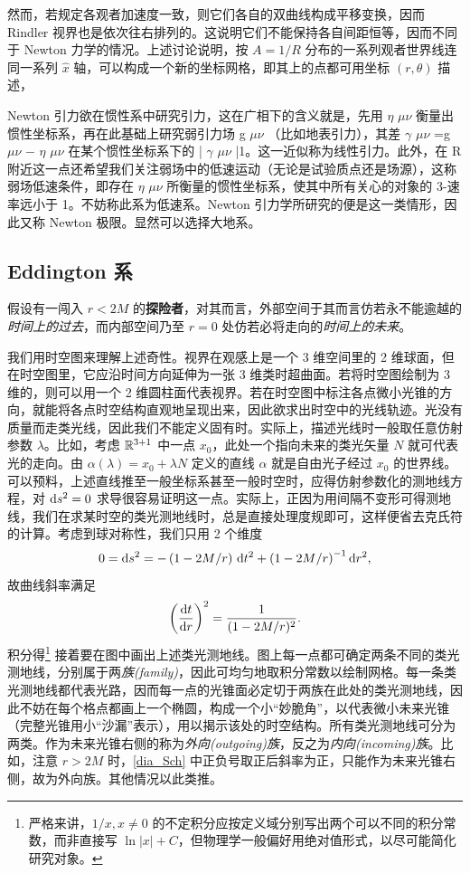然而，若规定各观者加速度一致，则它们各自的双曲线构成平移变换，因而 Rindler 视界也是依次往右排列的。这说明它们不能保持各自间距恒等，因而不同于 Newton 力学的情况。上述讨论说明，按 $A=1/R$ 分布的一系列观者世界线连同一系列 $\hat x$ 轴，可以构成一个新的坐标网格，即其上的点都可用坐标 $(r,\theta)$ 描述，


Newton 引力欲在惯性系中研究引力，这在广相下的含义就是，先用 
 $\eta$  $\mu\nu$ 
 衡量出惯性坐标系，再在此基础上研究弱引力场 
g $\mu\nu$ 
（比如地表引力），其差 
 $\gamma$  $\mu\nu$ =g $\mu\nu$ − $\eta$  $\mu\nu$ 
 在某个惯性坐标系下的 
| $\gamma$  $\mu\nu$ |1。这一近似称为线性引力。此外，在 R
 附近这一点还希望我们关注弱场中的低速运动（无论是试验质点还是场源），这称弱场低速条件，即存在  $\eta$  $\mu\nu$ 
 所衡量的惯性坐标系，使其中所有关心的对象的 3-速率远小于 1。不妨称此系为低速系。Newton 引力学所研究的便是这一类情形，因此又称 Newton 极限。显然可以选择大地系。

\subsection{Eddington 系}
假设有一闯入 $r<2M$ 的\textbf{探险者}，对其而言，外部空间于其而言仿若永不能逾越的\textit{时间上的过去}，而内部空间乃至 $r=0$ 处仿若必将走向的\textit{时间上的未来}。



我们用时空图来理解上述奇性。视界在观感上是一个 3 维空间里的 2 维球面，但在时空图里，它应沿时间方向延伸为一张 3 维类时超曲面。若将时空图绘制为 3 维的，则可以用一个 2 维圆柱面代表视界。若在时空图中标注各点微小光锥的方向，就能将各点时空结构直观地呈现出来，因此欲求出时空中的光线轨迹。光没有质量而走类光线，因此我们不能定义固有时。实际上，描述光线时一般取任意仿射参数 $\lambda$。比如，考虑 $\mathbb{R}^{3+1}$ 中一点 $x_{0}$，此处一个指向未来的类光矢量 $N$ 就可代表光的走向。由 $\alpha(\lambda)=x_{0}+\lambda N$ 定义的直线 $\alpha$ 就是自由光子经过 $x_{0}$ 的世界线。可以预料，上述直线推至一般坐标系甚至一般时空时，应得仿射参数化的测地线方程，对 $\dd s^2=0$ 求导很容易证明这一点。实际上，正因为用间隔不变形可得测地线，我们在求某时空的类光测地线时，总是直接处理度规即可，这样便省去克氏符的计算。考虑到球对称性，我们只用 2 个维度
\[
0=\dd s^2=-\left(1-{2M}/{r}\right)\,\text d t^2+\left(1-{2M}/{r}\right)^{-1}\text d r^2,
\]
故曲线斜率满足
\[
\left(\dv{t}{r}\right)^2=\frac{1}{(1-2M/r)^2}.
\]
积分得\footnote{严格来讲，$1/x,x\ne 0$ 的不定积分应按定义域分别写出两个可以不同的积分常数，而非直接写 $\ln |x|+C$，但物理学一般偏好用绝对值形式，以尽可能简化研究对象。}
接着要在图中画出上述类光测地线。图上每一点都可确定两条不同的类光测地线，分别属于两\textit{族(family)}，因此可均匀地取积分常数以绘制网格。每一条类光测地线都代表光路，因而每一点的光锥面必定切于两族在此处的类光测地线，因此不妨在每个格点都画上一个椭圆，构成一个小“妙脆角”，以代表微小未来光锥（完整光锥用小“沙漏”表示），用以揭示该处的时空结构。所有类光测地线可分为两类。作为未来光锥右侧的称为\textit{外向(outgoing)族}，反之为\textit{内向(incoming)族}。比如，注意 $r>2M$ 时，\eqref{dia_Sch} 中正负号取正后斜率为正，只能作为未来光锥右侧，故为外向族。其他情况以此类推。



